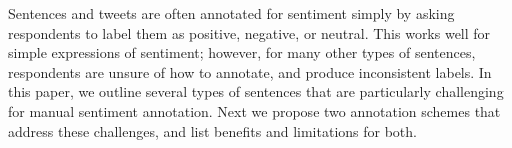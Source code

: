 Sentences and tweets are often annotated for sentiment simply by asking respondents to label them as positive, negative, or neutral. This works well for simple expressions of sentiment; however, for many other types of sentences, respondents are unsure of how to annotate, and produce inconsistent labels. In this paper, we outline several types of sentences that are particularly challenging for manual sentiment annotation. Next we propose two annotation schemes that address these challenges, and list benefits and limitations for both.
